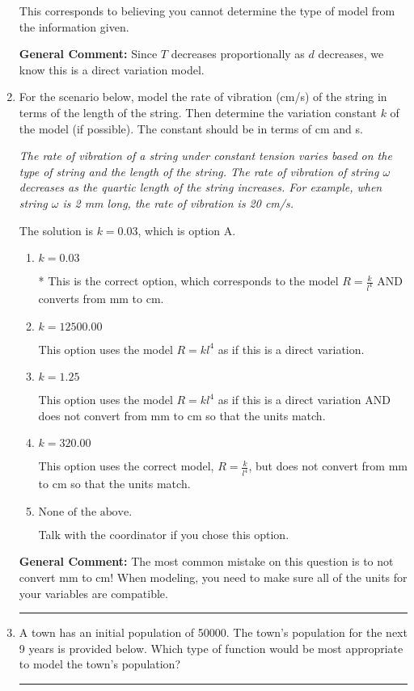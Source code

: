 \documentclass{extbook}[14pt]
\newcommand{\litem}[1]{\item #1

\rule{\textwidth}{0.4pt}}
\begin{document}
\begin{enumerate}
{\begin{enumerate}[label=\Alph*.]
This corresponds to believing you cannot determine the type of model from the information given.
\end{enumerate}

\textbf{General Comment:} Since $T$ decreases proportionally as $d$ decreases, we know this is a direct variation model.
}
\litem{
For the scenario below, model the rate of vibration (cm/s) of the string in terms of the length of the string. Then determine the variation constant $k$ of the model (if possible). The constant should be in terms of cm and s.

\begin{center}
    \textit{ The rate of vibration of a string under constant tension varies based on the type of string and the length of the string. The rate of vibration of string $\omega$ decreases as the quartic length of the string increases. For example, when string $\omega$ is 2 mm long, the rate of vibration is 20 cm/s. }
\end{center}
The solution is \( k = 0.03 \), which is option A.\begin{enumerate}[label=\Alph*.]
\item \( k = 0.03 \)

* This is the correct option, which corresponds to the model $R = \frac{k}{l^{4}}$ AND converts from mm to cm.
\item \( k = 12500.00 \)

This option uses the model $R = kl^{4}$ as if this is a direct variation.
\item \( k = 1.25 \)

This option uses the model $R = kl^{4}$ as if this is a direct variation AND does not convert from mm to cm so that the units match.
\item \( k = 320.00 \)

This option uses the correct model, $R = \frac{k}{l^{4}}$, but does not convert from mm to cm so that the units match.
\item \( \text{None of the above.} \)

Talk with the coordinator if you chose this option.
\end{enumerate}

\textbf{General Comment:} The most common mistake on this question is to not convert mm to cm! When modeling, you need to make sure all of the units for your variables are compatible.
}
\litem{
A town has an initial population of 50000. The town's population for the next 9 years is provided below. Which type of function would be most appropriate to model the town's population?


}
\end{enumerate}
\end{document}
